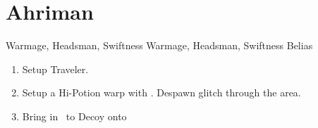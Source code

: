 \chapter{Ahriman}
\begin{liscense}
\begin{itemize}
\ashef Warmage, Headsman, Swiftness
\penelof Warmage, Headsman, Swiftness
\vaanf Belias
\end{itemize}
\end{liscense}
\begin{enumerate}
\item Setup Traveler.
\item Setup a Hi-Potion warp with \basch. Despawn glitch through the area.
\item Bring in \ashe\ to Decoy onto \vaan
\end{enumerate}